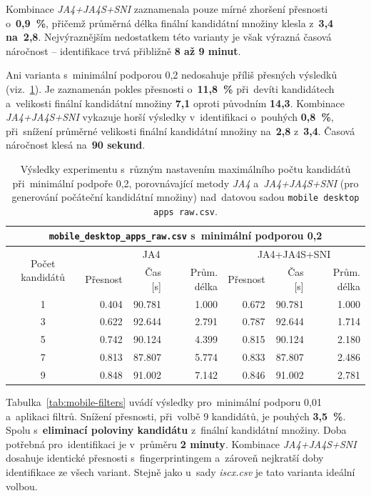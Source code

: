 Kombinace \textit{JA4+JA4S+SNI} zaznamenala pouze mírné zhoršení přesnosti o~\textbf{0{,}9~\%}, přičemž průměrná délka finální kandidátní množiny klesla z~\textbf{3{,}4 na~2{,}8}. Nejvýraznějším nedostatkem této varianty je však výrazná časová náročnost -- identifikace trvá přibližně \textbf{8 až 9 minut}.

Ani varianta s~minimální podporou 0{,}2 nedosahuje příliš přesných výsledků (viz.~\ref{tab:mobile-02}). Je zaznamenán pokles přesnosti o~\textbf{11{,}8~\%} při~devíti kandidátech a~velikosti finální kandidátní množiny \textbf{7{,}1} oproti původním \textbf{14{,}3}. Kombinace \textit{JA4+JA4S+SNI} vykazuje horší výsledky v~identifikaci o~pouhých \textbf{0{,}8~\%}, při~snížení průměrné velikosti finální kandidátní množiny na~\textbf{2{,}8} z~\textbf{3{,}4}. Časová náročnost klesá na~\textbf{90 sekund}.

\begin{table}[H]
	\centering
	\begin{tabular}{c|rrr|rrr}
		\toprule
		\multicolumn{7}{c}{\texttt{mobile\_desktop\_apps\_raw.csv} s~minimální podporou 0{,}2}  \\
		\midrule
		\multirow{2}{*}{Počet kandidátů} & \multicolumn{3}{c}{JA4} & \multicolumn{3}{c}{JA4+JA4S+SNI}\\
		  & Přesnost & Čas [s] & Prům. délka & Přesnost & Čas [s] & Prům. délka \\
		\midrule
		1 & 0.404     & 90.781   & 1.000         & 0.672     & 90.781   & 1.000         \\
		3 & 0.622     & 92.644   & 2.791         & 0.787     & 92.644   & 1.714         \\
		5 & 0.742     & 90.124   & 4.399         & 0.815     & 90.124   & 2.180         \\
		7 & 0.813     & 87.807   & 5.774         & 0.833     & 87.807   & 2.486         \\
		9 & 0.848     & 91.002   & 7.142         & 0.846     & 91.002   & 2.781         \\
		\bottomrule
	\end{tabular}
	\caption{Výsledky experimentu s~různým nastavením maximálního počtu kandidátů při~minimální podpoře 0{,}2, porovnávající metody \textit{JA4} a~\textit{JA4+JA4S+SNI} (pro generování počáteční kandidátní množiny) nad~datovou sadou \texttt{mobile desktop apps raw.csv}.}
	\label{tab:mobile-02}
\end{table}

Tabulka~\ref{tab:mobile-filters} uvádí výsledky pro~minimální podporu 0{,}01 a~aplikaci filtrů. Snížení přesnosti, při~volbě 9 kandidátů, je pouhých \textbf{3{,}5~\%}. Spolu s~\textbf{eliminací poloviny kandidátu} z~finální kandidátní množiny. Doba potřebná pro~identifikaci je v~průměru \textbf{2 minuty}. Kombinace \textit{JA4+JA4S+SNI} dosahuje identické přesnosti s~fingerprintingem a~zároveň nejkratší doby identifikace ze všech variant. Stejně jako u~sady \textit{iscx.csv} je tato varianta ideální volbou.

